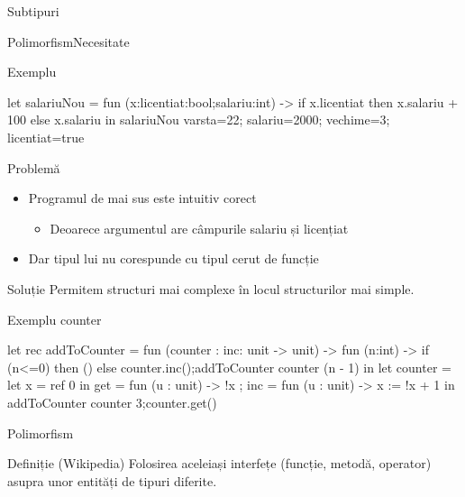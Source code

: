 \documentclass[xcolor=pdftex,romanian,colorlinks]{beamer}
\begin{document}
\begin{section}{Subtipuri}
\begin{frame}[fragile]{Polimorfism}{Necesitate}
\begin{block}{Exemplu}
\begin{asciiml}
let salariuNou = fun (x:{licentiat:bool;salariu:int}) 
   -> if x.licentiat then x.salariu + 100
                     else x.salariu
in salariuNou {varsta=22; salariu=2000; vechime=3; licentiat=true }
\end{asciiml}
\end{block}
\begin{alertblock}{Problemă}
\begin{itemize}
\item Programul de mai sus este intuitiv corect
\begin{itemize}\item Deoarece argumentul are câmpurile salariu și licențiat
\end{itemize}
\item Dar tipul lui nu corespunde cu tipul cerut de funcție
\end{itemize}
\end{alertblock}

\begin{block}{Soluție}
Permitem structuri mai complexe în locul structurilor mai simple.
\end{block}
\end{frame}

\begin{frame}[fragile]{Exemplu counter}
\begin{asciiml}
let rec addToCounter = fun (counter : {inc: unit -> unit}) -> fun (n:int) ->
  if (n<=0) then () else counter.inc();addToCounter counter (n - 1)
in let counter = let x = ref 0 in {
  get = fun (u : unit) -> !x ;
  inc = fun (u : unit) -> x := !x + 1 
} 
in addToCounter counter 3;counter.get()
\end{asciiml}
\end{frame}

\begin{frame}{Polimorfism}
\begin{block}{Definiție (Wikipedia)}
Folosirea aceleiași interfețe (funcție, metodă, operator) asupra unor entități de tipuri diferite.
\end{block}


\end{frame}
\end{section}
\end{document}
